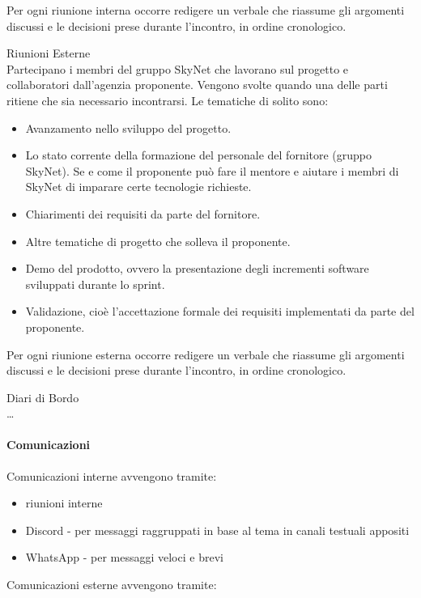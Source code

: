 \documentclass[12pt, a4paper]{article}
\begin{document}
Per ogni riunione interna occorre redigere un verbale che riassume gli
argomenti discussi e le decisioni prese durante l'incontro, in ordine
cronologico.

 {Riunioni Esterne}\\
Partecipano i membri del gruppo SkyNet che lavorano sul progetto e
collaboratori dall'agenzia proponente. Vengono svolte quando una delle
parti ritiene che sia necessario incontrarsi. Le tematiche di solito
sono:

\begin{itemize}
\item
  Avanzamento nello sviluppo del progetto.
\item
  Lo stato corrente della formazione del personale del fornitore (gruppo
  SkyNet). Se e come il proponente può fare il mentore e aiutare i
  membri di SkyNet di imparare certe tecnologie richieste.
\item
  Chiarimenti dei requisiti da parte del fornitore.
\item
  Altre tematiche di progetto che solleva il proponente.
\item
  Demo del prodotto, ovvero la presentazione degli incrementi software
  sviluppati durante lo sprint.
\item
  Validazione, cioè l'accettazione formale dei requisiti implementati da
  parte del proponente.
\end{itemize}

Per ogni riunione esterna occorre redigere un verbale che riassume gli
argomenti discussi e le decisioni prese durante l'incontro, in ordine
cronologico.

 {Diari di Bordo}\\
\ldots{}

\paragraph{Comunicazioni}

Comunicazioni interne avvengono tramite:

\begin{itemize}
\item
  riunioni interne
\item
  Discord - per messaggi raggruppati in base al tema in canali testuali
  appositi
\item
  WhatsApp - per messaggi veloci e brevi
\end{itemize}

Comunicazioni esterne avvengono tramite:
\end{document}

